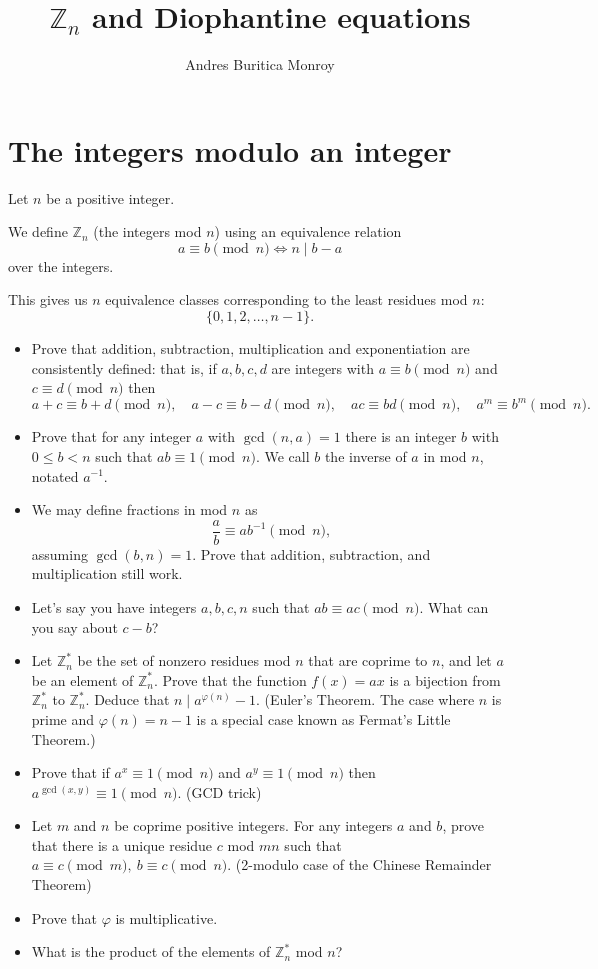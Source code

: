 \documentclass{article}
\title{$\mathbb Z_n$ and Diophantine equations}
\author{Andres Buritica Monroy}
\date{}
\begin{document}
\maketitle
\section{The integers modulo an integer}
Let $n$ be a positive integer.

We define $\mathbb Z_n$ (the integers mod $n$) using an equivalence relation
\[a\equiv b\pmod n\iff n\mid b-a\]
over the integers.

This gives us $n$ equivalence classes corresponding to the least residues mod
$n$: \[\{0,1,2,\ldots,n-1\}.\]
\begin{itemize}
	\item Prove that addition, subtraction, multiplication and exponentiation
	      are consistently defined: that
	      is, if $a,b,c,d$ are integers with $a\equiv b\pmod n$ and $c\equiv d\pmod
		      n$ then \[a+c\equiv b+d\pmod n,\quad a-c\equiv b-d\pmod n,\quad ac\equiv
		      bd\pmod n,\quad a^m\equiv b^m\pmod n.\]
	\item Prove that for any integer $a$ with $\gcd(n,a)=1$ there is an integer $b$
	      with $0\le b<n$ such that $ab\equiv 1\pmod n$. We call $b$ the inverse of
	      $a$ in mod $n$, notated $a^{-1}$.
	\item We may define fractions in mod $n$ as \[\frac ab\equiv ab^{-1}\pmod n,\]
	      assuming $\gcd(b,n)=1$. Prove that addition, subtraction, and
	      multiplication still work.
	\item Let's say you have integers $a,b,c,n$ such that $ab\equiv ac\pmod n$.
	      What can you say about $c-b$?
	\item Let $\mathbb Z_n^*$ be the set of nonzero residues mod $n$ that are
	      coprime to $n$, and let $a$ be an
	      element of $\mathbb Z_n^*$. Prove that the function $f(x)=ax$ is a
	      bijection from $\mathbb Z_n^*$ to $\mathbb Z_n^*$. Deduce that $n\mid
		      a^{\varphi(n)}-1$. (Euler's Theorem. The case where $n$ is prime and
	      $\varphi(n)=n-1$ is a special case known as Fermat's Little Theorem.)
	\item Prove that if $a^x\equiv 1\pmod n$ and $a^y\equiv 1\pmod n$ then
	      $a^{\gcd(x,y)}\equiv 1\pmod n$. (GCD trick)
	\item Let $m$ and $n$ be coprime positive integers. For any integers $a$ and
	      $b$, prove that there is a unique residue $c$ mod $mn$ such that $a\equiv
		      c\pmod m,\ b\equiv c\pmod n$. (2-modulo case of the Chinese Remainder
	      Theorem)
	\item Prove that $\varphi$ is multiplicative.
	\item What is the product of the elements of $\mathbb Z_n^*$ mod $n$?
\end{itemize}
\newpage
\end{document}
